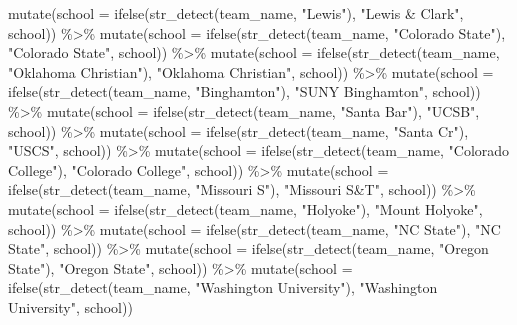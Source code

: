 \documentclass[
  letterpaper,
  DIV=11,
  numbers=noendperiod]{scrartcl}
\newenvironment{Shaded}{\begin{snugshade}}{\end{snugshade}}
\newcommand{\AttributeTok}[1]{\textcolor[rgb]{0.40,0.45,0.13}{#1}}
\newcommand{\FunctionTok}[1]{\textcolor[rgb]{0.28,0.35,0.67}{#1}}
\newcommand{\NormalTok}[1]{\textcolor[rgb]{0.00,0.23,0.31}{#1}}
\newcommand{\SpecialCharTok}[1]{\textcolor[rgb]{0.37,0.37,0.37}{#1}}
\newcommand{\StringTok}[1]{\textcolor[rgb]{0.13,0.47,0.30}{#1}}
\begin{document}
\begin{Shaded}
\begin{Highlighting}[]
  \FunctionTok{mutate}\NormalTok{(}\AttributeTok{school =} \FunctionTok{ifelse}\NormalTok{(}\FunctionTok{str\_detect}\NormalTok{(team\_name, }\StringTok{"Lewis"}\NormalTok{), }\StringTok{"Lewis \& Clark"}\NormalTok{, school))  }\SpecialCharTok{\%\textgreater{}\%}
  \FunctionTok{mutate}\NormalTok{(}\AttributeTok{school =} \FunctionTok{ifelse}\NormalTok{(}\FunctionTok{str\_detect}\NormalTok{(team\_name, }\StringTok{"Colorado State"}\NormalTok{), }\StringTok{"Colorado State"}\NormalTok{, school))  }\SpecialCharTok{\%\textgreater{}\%}
  \FunctionTok{mutate}\NormalTok{(}\AttributeTok{school =} \FunctionTok{ifelse}\NormalTok{(}\FunctionTok{str\_detect}\NormalTok{(team\_name, }\StringTok{"Oklahoma Christian"}\NormalTok{), }\StringTok{"Oklahoma Christian"}\NormalTok{, school))  }\SpecialCharTok{\%\textgreater{}\%}
  \FunctionTok{mutate}\NormalTok{(}\AttributeTok{school =} \FunctionTok{ifelse}\NormalTok{(}\FunctionTok{str\_detect}\NormalTok{(team\_name, }\StringTok{"Binghamton"}\NormalTok{), }\StringTok{"SUNY Binghamton"}\NormalTok{, school))  }\SpecialCharTok{\%\textgreater{}\%}
  \FunctionTok{mutate}\NormalTok{(}\AttributeTok{school =} \FunctionTok{ifelse}\NormalTok{(}\FunctionTok{str\_detect}\NormalTok{(team\_name, }\StringTok{"Santa Bar"}\NormalTok{), }\StringTok{"UCSB"}\NormalTok{, school))  }\SpecialCharTok{\%\textgreater{}\%}
  \FunctionTok{mutate}\NormalTok{(}\AttributeTok{school =} \FunctionTok{ifelse}\NormalTok{(}\FunctionTok{str\_detect}\NormalTok{(team\_name, }\StringTok{"Santa Cr"}\NormalTok{), }\StringTok{"USCS"}\NormalTok{, school))  }\SpecialCharTok{\%\textgreater{}\%}
  \FunctionTok{mutate}\NormalTok{(}\AttributeTok{school =} \FunctionTok{ifelse}\NormalTok{(}\FunctionTok{str\_detect}\NormalTok{(team\_name, }\StringTok{"Colorado College"}\NormalTok{), }\StringTok{"Colorado College"}\NormalTok{, school))  }\SpecialCharTok{\%\textgreater{}\%}
  \FunctionTok{mutate}\NormalTok{(}\AttributeTok{school =} \FunctionTok{ifelse}\NormalTok{(}\FunctionTok{str\_detect}\NormalTok{(team\_name, }\StringTok{"Missouri S"}\NormalTok{), }\StringTok{"Missouri S\&T"}\NormalTok{, school))  }\SpecialCharTok{\%\textgreater{}\%}
  \FunctionTok{mutate}\NormalTok{(}\AttributeTok{school =} \FunctionTok{ifelse}\NormalTok{(}\FunctionTok{str\_detect}\NormalTok{(team\_name, }\StringTok{"Holyoke"}\NormalTok{), }\StringTok{"Mount Holyoke"}\NormalTok{, school))  }\SpecialCharTok{\%\textgreater{}\%}
  \FunctionTok{mutate}\NormalTok{(}\AttributeTok{school =} \FunctionTok{ifelse}\NormalTok{(}\FunctionTok{str\_detect}\NormalTok{(team\_name, }\StringTok{"NC State"}\NormalTok{), }\StringTok{"NC State"}\NormalTok{, school))  }\SpecialCharTok{\%\textgreater{}\%}
  \FunctionTok{mutate}\NormalTok{(}\AttributeTok{school =} \FunctionTok{ifelse}\NormalTok{(}\FunctionTok{str\_detect}\NormalTok{(team\_name, }\StringTok{"Oregon State"}\NormalTok{), }\StringTok{"Oregon State"}\NormalTok{, school))  }\SpecialCharTok{\%\textgreater{}\%}
  \FunctionTok{mutate}\NormalTok{(}\AttributeTok{school =} \FunctionTok{ifelse}\NormalTok{(}\FunctionTok{str\_detect}\NormalTok{(team\_name, }\StringTok{"Washington University"}\NormalTok{), }\StringTok{"Washington University"}\NormalTok{, school))}
\end{Highlighting}
\end{Shaded}
\end{document}
